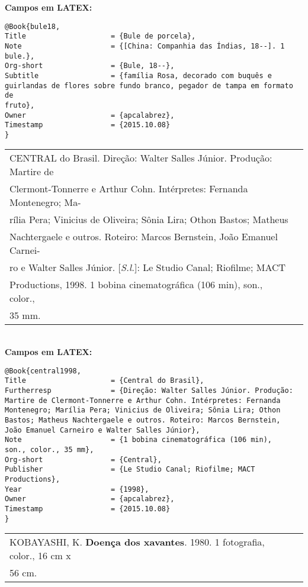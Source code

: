 \textbf{Campos em LATEX:} 

\begin{verbatim}
@Book{bule18,
Title                    = {Bule de porcela},
Note                     = {[China: Companhia das Índias, 18--]. 1 
bule.}, 
Org-short                = {Bule, 18--},
Subtitle                 = {família Rosa, decorado com buquês e 
guirlandas de flores sobre fundo branco, pegador de tampa em formato de 
fruto},
Owner                    = {apcalabrez},
Timestamp                = {2015.10.08}
}
\end{verbatim}

\begin{tabular}{|l|c|} \hline
	CENTRAL do Brasil. Direção: Walter Salles Júnior. Produção: Martire de\\
	Clermont-Tonnerre e Arthur Cohn. Intérpretes: Fernanda Montenegro; Ma-\\
	rília Pera; Vinicius de Oliveira; Sônia Lira; Othon Bastos; Matheus\\ 
	Nachtergaele e outros. Roteiro: Marcos Bernstein, João Emanuel Carnei-\\
	ro e Walter Salles Júnior. [\textit{S.l.}]: Le Studio Canal; Riofilme; MACT \\
	Productions, 1998. 1 bobina cinematográfica (106 min), son., color., 
	\\35 mm. 
	\\\hline
\end{tabular} \\

\textbf{Campos em LATEX:} 

\begin{verbatim}
@Book{central1998,
Title                    = {Central do Brasil},
Furtherresp              = {Direção: Walter Salles Júnior. Produção: 
Martire de Clermont-Tonnerre e Arthur Cohn. Intérpretes: Fernanda 
Montenegro; Marília Pera; Vinicius de Oliveira; Sônia Lira; Othon 
Bastos; Matheus Nachtergaele e outros. Roteiro: Marcos Bernstein, 
João Emanuel Carneiro e Walter Salles Júnior},
Note                     = {1 bobina cinematográfica (106 min), 
son., color., 35 mm},
Org-short                = {Central},
Publisher                = {Le Studio Canal; Riofilme; MACT 
Productions},
Year                     = {1998},
Owner                    = {apcalabrez},
Timestamp                = {2015.10.08}
}
\end{verbatim}

\begin{tabular}{|l|c|} \hline
	KOBAYASHI, K. \textbf{Doença dos xavantes}. 1980. 1 fotografia, color., 16 cm x \\
	56 cm. 
	\\\hline
\end{tabular} \\

